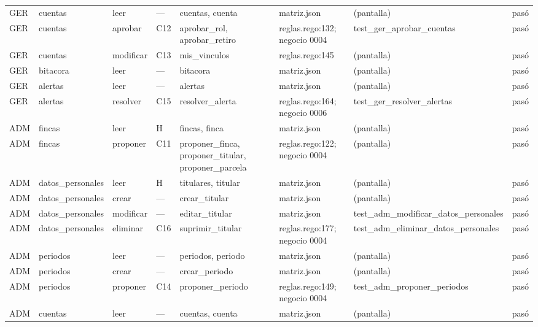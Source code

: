 \begin{center}
\begin{longtable}{@{}p{0.6cm} p{1.7cm} p{1.2cm} p{0.9cm} p{3.4cm} p{2.6cm} p{3.4cm} p{0.8cm}@{}}
GER & cuentas & leer & — & cuentas, \allowbreak{}cuenta & matriz.json & (pantalla) & pasó \\
GER & cuentas & aprobar & C12 & aprobar\_rol, \allowbreak{}aprobar\_retiro & reglas.rego:132; negocio 0004 & test\_\allowbreak{}ger\_\allowbreak{}aprobar\_\allowbreak{}cuentas & pasó \\
GER & cuentas & modificar & C13 & mis\_vinculos & reglas.rego:145 & (pantalla) & pasó \\
GER & bitacora & leer & — & bitacora & matriz.json & (pantalla) & pasó \\
GER & alertas & leer & — & alertas & matriz.json & (pantalla) & pasó \\
GER & alertas & resolver & C15 & resolver\_alerta & reglas.rego:164; negocio 0006 & test\_\allowbreak{}ger\_\allowbreak{}resolver\_\allowbreak{}alertas & pasó \\
ADM & fincas & leer & H & fincas, \allowbreak{}finca & matriz.json & (pantalla) & pasó \\
ADM & fincas & proponer & C11 & proponer\_finca, \allowbreak{}proponer\_titular, \allowbreak{}proponer\_parcela & reglas.rego:122; negocio 0004 & (pantalla) & pasó \\
ADM & datos\_\allowbreak{}personales & leer & H & titulares, \allowbreak{}titular & matriz.json & (pantalla) & pasó \\
ADM & datos\_\allowbreak{}personales & crear & — & crear\_titular & matriz.json & (pantalla) & pasó \\
ADM & datos\_\allowbreak{}personales & modificar & — & editar\_titular & matriz.json & test\_\allowbreak{}adm\_\allowbreak{}modificar\_\allowbreak{}datos\_\allowbreak{}personales & pasó \\
ADM & datos\_\allowbreak{}personales & eliminar & C16 & suprimir\_titular & reglas.rego:177; negocio 0004 & test\_\allowbreak{}adm\_\allowbreak{}eliminar\_\allowbreak{}datos\_\allowbreak{}personales & pasó \\
ADM & periodos & leer & — & periodos, \allowbreak{}periodo & matriz.json & (pantalla) & pasó \\
ADM & periodos & crear & — & crear\_periodo & matriz.json & (pantalla) & pasó \\
ADM & periodos & proponer & C14 & proponer\_periodo & reglas.rego:149; negocio 0004 & test\_\allowbreak{}adm\_\allowbreak{}proponer\_\allowbreak{}periodos & pasó \\
ADM & cuentas & leer & — & cuentas, \allowbreak{}cuenta & matriz.json & (pantalla) & pasó \\

\end{longtable}
\end{center}
